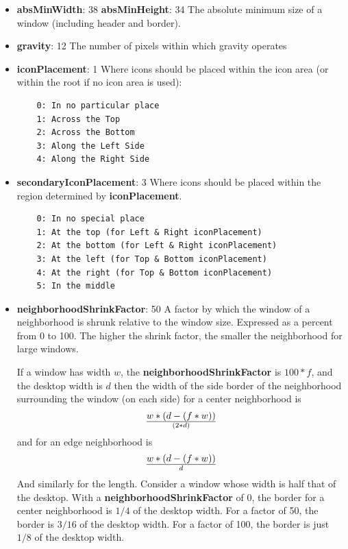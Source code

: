 \begin{itemize}
\item {\bf absMinWidth}: 38\newline{}
{\bf absMinHeight}: 34\newline{}
The absolute minimum size of a window (including header and border).

\item {\bf gravity}: 12\newline{}
The number of pixels within which gravity operates

\item {\bf iconPlacement}: 1\newline{}
Where icons should be placed within the icon area (or within the root
if no icon area is used):
\begin{verbatim}
    0: In no particular place
    1: Across the Top
    2: Across the Bottom
    3: Along the Left Side
    4: Along the Right Side
\end{verbatim}

\item 
{\bf secondaryIconPlacement}: 3\newline{}
Where icons should be placed within the region determined by
{\bf iconPlacement}.
\begin{verbatim}
    0: In no special place
    1: At the top (for Left & Right iconPlacement)
    2: At the bottom (for Left & Right iconPlacement)
    3: At the left (for Top & Bottom iconPlacement)
    4: At the right (for Top & Bottom iconPlacement)
    5: In the middle
\end{verbatim}


\item 
{\bf neighborhoodShrinkFactor}: 50\newline{}
A factor by which the window of a neighborhood is shrunk relative
to the window size.  Expressed as a percent from 0 to 100.
The higher the shrink factor, the smaller the neighborhood for large
windows.

If a window has width $w$, the {\bf neighborhoodShrinkFactor} is $100*f$,
and the desktop width is $d$ then the width of the side border of
the neighborhood surrounding the window (on each side)
for a center neighborhood is
$$w * ( d - (f * w) ) \over (2 * d)$$
and for an edge neighborhood is
$$w * ( d - (f * w) ) \over d$$
And similarly for the length.
Consider a window whose width is half that of the desktop.
With a {\bf neighborhoodShrinkFactor} of 0, the border for a center
neighborhood is $1/4$ of the desktop width.  For a factor of 50,
the border is $3/16$ of the desktop width.  For a factor of 100,
the border is just $1/8$ of the desktop width.

\end{itemize}

